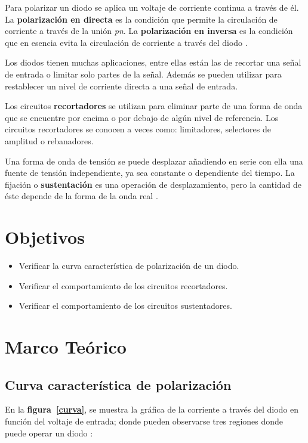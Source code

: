 \documentclass[letter,twoside,11pt]{article}
\begin{document}
Para polarizar un diodo se aplica un voltaje de corriente continua a través de
él. La \textbf{polarización en directa} es la condición que permite la
circulación de corriente a través de la unión \emph{pn}. La \textbf{polarización
en inversa} es la condición que en esencia evita la circulación de corriente a
través del diodo \cite{Floyd}.

Los diodos tienen muchas aplicaciones, entre ellas están las de recortar una
señal de entrada o limitar solo partes de la señal. Además se pueden utilizar
para restablecer un nivel de corriente directa a una señal de entrada.

Los circuitos \textbf{recortadores} se utilizan para eliminar parte de una forma
de onda que se encuentre por encima o por debajo de algún nivel de referencia.
Los circuitos recortadores se conocen a veces como: limitadores, selectores de
amplitud o rebanadores.

Una forma de onda de tensión se puede desplazar añadiendo en serie con ella una
fuente de tensión independiente, ya sea constante o dependiente del tiempo. La
fijación o \textbf{sustentación} es una operación de desplazamiento, pero la
cantidad de éste depende de la forma de la onda real \cite{Savant}.

\section{Objetivos}
\begin{itemize}
    \item Verificar la curva característica de polarización de un diodo.
    \item Verificar el comportamiento de los circuitos recortadores.
    \item Verificar el comportamiento de los circuitos sustentadores.
\end{itemize}

\section{Marco Teórico}

\subsection{Curva característica de polarización}
En la \textbf{figura~\ref{curva}}, se muestra la gráfica de la corriente a
través del diodo en función del voltaje de entrada; donde pueden observarse tres
regiones donde puede operar un diodo \cite{Tancara}:
\end{document}
